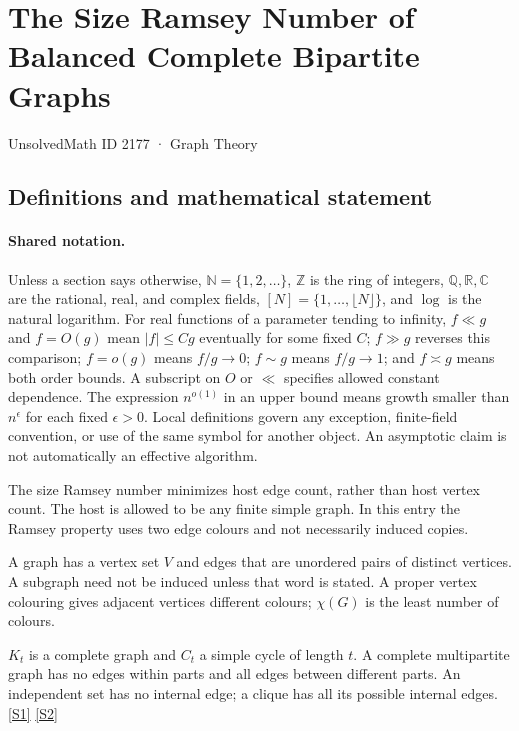 \documentclass[11pt,a4paper]{article}
\newcommand{\N}{\mathbb{N}}
\newcommand{\Z}{\mathbb{Z}}
\newcommand{\Q}{\mathbb{Q}}
\newcommand{\R}{\mathbb{R}}
\newcommand{\C}{\mathbb{C}}
\newcommand{\sref}[2]{\hyperlink{source:#1:#2}{[S#2]}}
\begin{document}

\setcounter{section}{2176}

\section{The Size Ramsey Number of Balanced Complete Bipartite Graphs}\label{2177}

{\small\sffamily UnsolvedMath ID 2177 · Graph Theory}

\subsection{Definitions and mathematical statement}

\paragraph{Shared notation.}Unless a section says otherwise, $\N=\{1,2,\ldots\}$,
$\Z$ is the ring of integers, $\Q,\R,\C$ are the rational, real, and complex
fields, $[N]=\{1,\ldots,\lfloor N\rfloor\}$, and $\log$ is the natural
logarithm. For real functions of a parameter tending to infinity,
$f\ll g$ and $f=O(g)$ mean $|f|\leq Cg$ eventually for some fixed $C$;
$f\gg g$ reverses this comparison; $f=o(g)$ means $f/g\to0$;
$f\sim g$ means $f/g\to1$; and $f\asymp g$ means both order bounds.
A subscript on $O$ or $\ll$ specifies allowed constant dependence.
The expression $n^{o(1)}$ in an upper bound means growth smaller than
$n^\epsilon$ for each fixed $\epsilon>0$. Local definitions govern any
exception, finite-field convention, or use of the same symbol for another
object. An asymptotic claim is not automatically an effective algorithm.



The size Ramsey number minimizes host edge count, rather than host vertex count. The host is allowed to be any finite simple graph. In this entry the Ramsey property uses two edge colours and not necessarily induced copies.

A graph has a vertex set $V$ and edges that are unordered pairs of distinct vertices. A subgraph need not be induced unless that word is stated. A proper vertex colouring gives adjacent vertices different colours; $\chi(G)$ is the least number of colours.

$K_t$ is a complete graph and $C_t$ a simple cycle of length $t$. A complete multipartite graph has no edges within parts and all edges between different parts. An independent set has no internal edge; a clique has all its possible internal edges. \sref{2177}{1} \sref{2177}{2}
\end{document}
